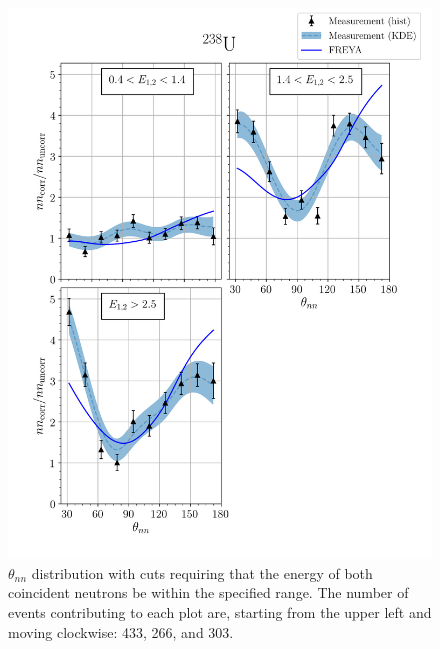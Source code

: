 \begin{figure}
\centering
    \includegraphics[width = 1.1\textwidth]{Content/Results/FinalDUResultw_freya2KDE.png}
    \caption{ $\theta_{nn}$ distribution with cuts requiring that the energy of both coincident neutrons be within the specified range.
    The number of events contributing to each plot are, starting from the upper left and moving clockwise: 433, 266, and 303.}
    \label{fig:DU(2)}
\end{figure}
